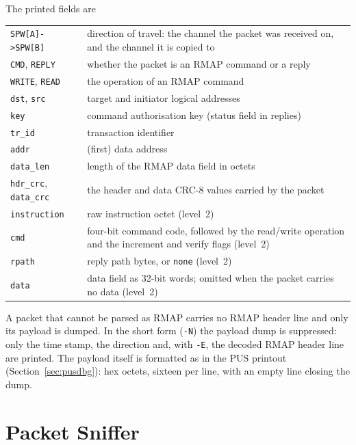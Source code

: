 \noindent
The printed fields are

\noindent
\begin{tabu} to 
	\texttt{SPW[A]->SPW[B]}	& direction of travel: the channel the packet was received on, and the channel it is copied to \\
	\texttt{CMD}, \texttt{REPLY} & whether the packet is an \gls{RMAP} command or a reply \\
	\texttt{WRITE}, \texttt{READ} & the operation of an \gls{RMAP} command \\
	\texttt{dst}, \texttt{src}	& target and initiator logical addresses \\
	\texttt{key}		& command authorisation key (status field in replies) \\
	\texttt{tr\_id}		& transaction identifier \\
	\texttt{addr}		& (first) data address \\
	\texttt{data\_len}	& length of the \gls{RMAP} data field in octets \\
	\texttt{hdr\_crc}, \texttt{data\_crc} & the header and data CRC-8 values carried by the packet \\
	\texttt{instruction}	& raw instruction octet (level~2) \\
	\texttt{cmd}		& four-bit command code, followed by the read/write operation and the increment and verify flags (level~2) \\
	\texttt{rpath}		& reply path bytes, or \texttt{none} (level~2) \\
	\texttt{data}		& data field as 32-bit words; omitted when the packet carries no data (level~2) \\
\end{tabu}

\noindent
A packet that cannot be parsed as \gls{RMAP} carries no \gls{RMAP}
header line and only its payload is dumped. In the short form (\texttt{-N})
the payload dump is suppressed: only the time stamp, the direction and, with
\texttt{-E}, the decoded \gls{RMAP} header line are printed. The
payload itself is formatted as in the PUS printout (Section~\ref{sec:pusdbg}):
hex octets, sixteen per line, with an empty line closing the dump.

\section{Packet Sniffer}
\label{sec:sniffer}

